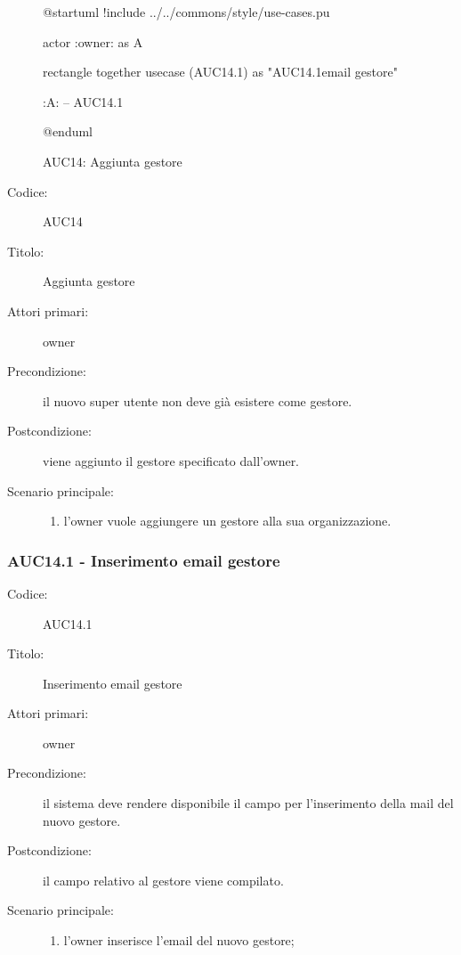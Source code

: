 \documentclass[../../../analisi-dei-requisiti.tex]{subfiles}
\begin{document}
\begin{figure}[h!]
  \centering
  \begin{plantuml}
  @startuml
  !include ../../commons/style/use-cases.pu

  actor :owner: as A

  rectangle {
    together {
      usecase (AUC14.1) as "AUC14.1\nInserimento email gestore"
    }
  }

  :A: -- AUC14.1

  @enduml
  \end{plantuml}
  \caption{AUC14: Aggiunta gestore}
  \label{fig:auc14}
\end{figure}

\begin{description}
  \item[Codice:] AUC14
  \item[Titolo:] Aggiunta gestore
  \item[Attori primari:] owner
  \item[Precondizione:] il nuovo super utente non deve già esistere come gestore.
  \item[Postcondizione:] viene aggiunto il gestore specificato dall'owner.
  \item[Scenario principale:]
  \begin{enumerate}
    \item l'owner vuole aggiungere un gestore alla sua organizzazione.
  \end{enumerate}
\end{description}

\subsubsection{AUC14.1 - Inserimento email gestore}%
\label{subs:AUC14.1}
\begin{description}
  \item[Codice:] AUC14.1
  \item[Titolo:] Inserimento email gestore
  \item[Attori primari:] owner
  \item[Precondizione:] il sistema deve rendere disponibile il campo per l'inserimento della mail del nuovo gestore.
  \item[Postcondizione:] il campo relativo al gestore viene compilato.
  \item[Scenario principale:]
  \begin{enumerate}
    \item l'owner inserisce l'email del nuovo gestore;
  \end{enumerate}
\end{description}
\end{document}
